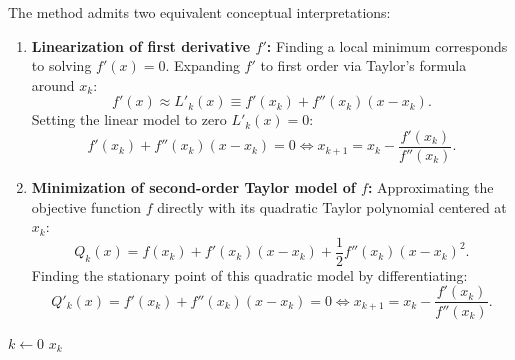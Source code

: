 The method admits two equivalent conceptual interpretations:
\begin{enumerate}
    \item \textbf{Linearization of first derivative $f'$:}
    Finding a local minimum corresponds to solving $f'(x) = 0$. Expanding $f'$ to first order via Taylor's formula around $x_k$:
    \begin{equation}
        f'(x) \approx L'_k(x) \equiv f'(x_k) + f''(x_k) (x - x_k).
    \end{equation}
    Setting the linear model to zero $L'_k(x) = 0$:
    \begin{equation}
        f'(x_k) + f''(x_k) (x - x_k) = 0 \iff x_{k+1} = x_k - \frac{f'(x_k)}{f''(x_k)}.
        \label{eq:newton-step-formula-en}
    \end{equation}
    \item \textbf{Minimization of second-order Taylor model of $f$:}
    Approximating the objective function $f$ directly with its quadratic Taylor polynomial centered at $x_k$:
    \begin{equation}
        Q_k(x) = f(x_k) + f'(x_k) (x - x_k) + \frac{1}{2} f''(x_k) (x - x_k)^2.
    \end{equation}
    Finding the stationary point of this quadratic model by differentiating:
    \begin{equation}
        Q'_k(x) = f'(x_k) + f''(x_k) (x - x_k) = 0 \iff x_{k+1} = x_k - \frac{f'(x_k)}{f''(x_k)}.
    \end{equation}
\end{enumerate}

\begin{algorithm}[htbp]
\caption{Pure Univariate Newton's Method (\texttt{UNM})}
\label{alg:pure-univariate-newton-en}
\BlankLine
$k \leftarrow 0$\;
\Return $x_k$\;
\end{algorithm}

